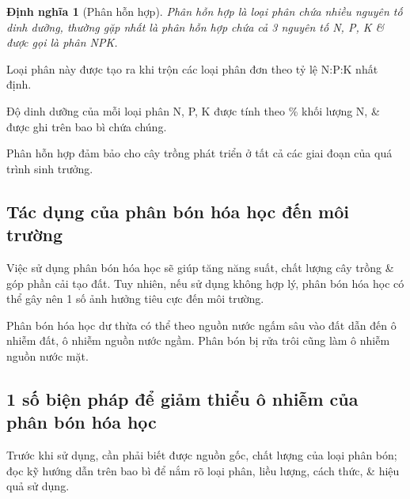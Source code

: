 \documentclass{article}
\newtheorem{dinhnghia}{Định nghĩa}
\begin{document}
\begin{dinhnghia}[Phân hỗn hợp]
	\emph{Phân hỗn hợp} là loại phân chứa nhiều nguyên tố dinh dưỡng, thường gặp nhất là phân hỗn hợp chứa cả 3 nguyên tố \emph{N, P, K} \& được gọi là \emph{phân NPK}.
\end{dinhnghia}
Loại phân này được tạo ra khi trộn các loại phân đơn theo tỷ lệ N:P:K nhất định.

Độ dinh dưỡng của mỗi loại phân N, P, K được tính theo \% khối lượng N,  \& được ghi trên bao bì chứa chúng.

Phân hỗn hợp đảm bảo cho cây trồng phát triển ở tất cả các giai đoạn của quá trình sinh trưởng.

\subsection{Tác dụng của phân bón hóa học đến môi trường}
Việc sử dụng phân bón hóa học sẽ giúp tăng năng suất, chất lượng cây trồng \& góp phần cải tạo đất. Tuy nhiên, nếu sử dụng không hợp lý, phân bón hóa học có thể gây nên 1 số ảnh hưởng tiêu cực đến môi trường.

Phân bón hóa học dư thừa có thể theo nguồn nước ngấm sâu vào đất dẫn đến ô nhiễm đất, ô nhiễm nguồn nước ngầm. Phân bón bị rửa trôi cũng làm ô nhiễm nguồn nước mặt.

\subsection{1 số biện pháp để giảm thiểu ô nhiễm của phân bón hóa học}
Trước khi sử dụng, cần phải biết được nguồn gốc, chất lượng của loại phân bón; đọc kỹ hướng dẫn trên bao bì để nắm rõ loại phân, liều lượng, cách thức, \& hiệu quả sử dụng.
\end{document}
